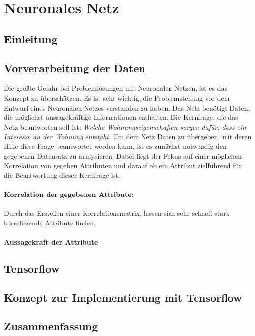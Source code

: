 \section{Neuronales Netz}\label{sec:kaptiel}
\subsection{Einleitung}
\subsection{Vorverarbeitung der Daten}
Die größte Gefahr bei Problemlösungen mit Neuronalen Netzen, ist es das Konzept zu überschätzen. 
Es ist sehr wichtig, die Problemstellung vor dem Entwurf eines Neuronalen Netzes verstanden zu haben. 
Das Netz benötigt Daten, die möglichst aussagekräftige Informationen enthalten. 
Die Kernfrage, die das Netz beantworten soll ist: 
\textit{Welche Wohnungseigenschaften sorgen dafür, dass ein Interesse an der Wohnung entsteht.}
Um dem Netz Daten zu übergeben, mit deren Hilfe diese Frage beantwortet werden kann, ist es zunächst notwendig
den gegebenen Datensatz zu analysieren. Dabei liegt der Fokus auf einer möglichen Korrelation von gegeben Attributen und darauf ob ein Attribut 
zielführend für die Beantwortung dieser Kernfrage ist. 
\paragraph{Korrelation der gegebenen Attribute:}

Durch das Erstellen einer Korrelationsmatrix, lassen sich sehr schnell stark korrelierende Attribute finden.


\paragraph{Aussagekraft der Attribute}


\subsection{Tensorflow}

\subsection{Konzept zur Implementierung mit Tensorflow}

\subsection{Zusammenfassung}
